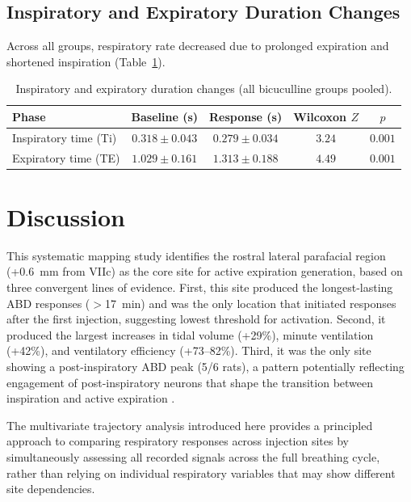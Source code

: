\documentclass[11pt]{article}
\begin{document}
\subsection{Inspiratory and Expiratory Duration Changes}

Across all groups, respiratory rate decreased due to prolonged expiration and shortened inspiration (Table~\ref{tab:timing}).

\begin{table}[H]
\centering
\caption{Inspiratory and expiratory duration changes (all bicuculline groups pooled).}
\label{tab:timing}
\begin{tabular}{lcccc}
\toprule
\textbf{Phase} & \textbf{Baseline (s)} & \textbf{Response (s)} & \textbf{Wilcoxon $Z$} & \textbf{$p$} \\
\midrule
Inspiratory time (Ti) & $0.318 \pm 0.043$ & $0.279 \pm 0.034$ & $3.24$ & $0.001$ \\
Expiratory time (TE) & $1.029 \pm 0.161$ & $1.313 \pm 0.188$ & $4.49$ & $0.001$ \\
\bottomrule
\end{tabular}
\end{table}

\section{Discussion}

This systematic mapping study identifies the rostral lateral parafacial region (+0.6~mm from VIIc) as the core site for active expiration generation, based on three convergent lines of evidence. First, this site produced the longest-lasting ABD responses ($>$17~min) and was the only location that initiated responses after the first injection, suggesting lowest threshold for activation. Second, it produced the largest increases in tidal volume (+29\%), minute ventilation (+42\%), and ventilatory efficiency (+73--82\%). Third, it was the only site showing a post-inspiratory ABD peak (5/6 rats), a pattern potentially reflecting engagement of post-inspiratory neurons that shape the transition between inspiration and active expiration \citep{smith2013brainstem, abdala2009abdominal}.

The multivariate trajectory analysis introduced here provides a principled approach to comparing respiratory responses across injection sites by simultaneously assessing all recorded signals across the full breathing cycle, rather than relying on individual respiratory variables that may show different site dependencies.
\end{document}
